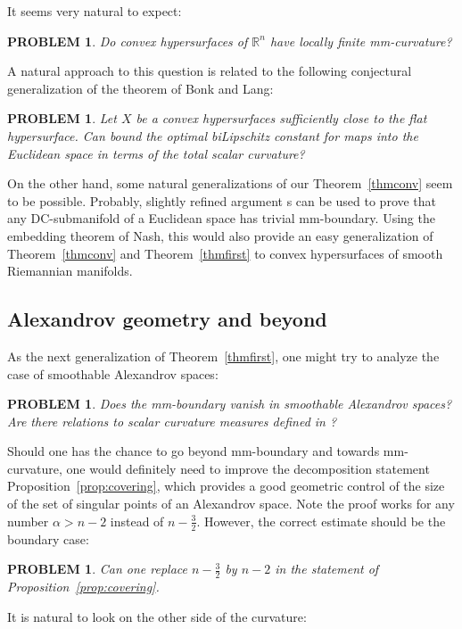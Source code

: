 \documentclass[12pt,leqno]{amsart}
\numberwithin{equation}{section}
\newtheorem{quest}[thm]{PROBLEM}
\theoremstyle{definition}
\theoremstyle{remark}
\newcommand{\tref}[1]{Theorem~\ref{#1}}
\newcommand{\pref}[1]{Proposition~\ref{#1}}
\newcommand{\R}{\mathbb{R}}
\begin{document}
It seems very natural to expect:
\begin{quest}
Do  convex hypersurfaces of $\R^n$ have locally finite mm-curvature?
\end{quest}


 A natural approach to this question is related to  the following conjectural generalization of the theorem of Bonk and Lang:
 \begin{quest}
 Let $X$ be a convex hypersurfaces sufficiently close to the flat hypersurface. Can bound the optimal biLipschitz constant for maps into the Euclidean space in terms of the total scalar curvature?
 \end{quest}
 
On the other hand, some natural generalizations of our \tref{thmconv} seem to  be possible. Probably, slightly refined argument s can be used to 
prove that any DC-submanifold of a Euclidean space has trivial mm-boundary. Using the embedding theorem of Nash, this would also provide an easy generalization of \tref{thmconv} and \tref{thmfirst} to convex hypersurfaces of smooth Riemannian manifolds.



\subsection{Alexandrov geometry and beyond}
As the next generalization of \tref{thmfirst}, one might try  to analyze the case of smoothable Alexandrov spaces:

\begin{quest}
Does the mm-boundary vanish  in smoothable Alexandrov spaces?   Are there relations to scalar curvature measures defined in \cite{LP}?
\end{quest}


Should one has the chance to go beyond mm-boundary and towards mm-curvature, one would definitely need to improve the 
decomposition statement \pref{prop:covering}, which provides a good geometric control of the size of the set of singular points of an Alexandrov space. Note the proof works for any number $\alpha >n-2$ instead of $n-\frac 3 2$. However, the correct estimate should be the boundary case:  
\begin{quest} \label{qe:control}
Can one replace $n-\frac 3 2$ by $n-2$ in the statement of \pref{prop:covering}.
\end{quest}

 
 It is natural to look on the other side of the curvature:
 
\end{document}
